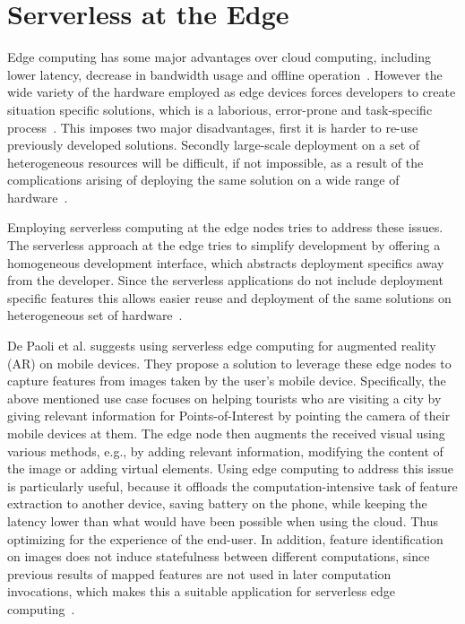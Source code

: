 \documentclass[article]{aaltoseries}
\begin{document}
\section{Serverless at the Edge}\label{sec:pros-and-cons}
Edge computing has some major advantages over cloud computing, including lower latency, decrease in bandwidth usage and offline operation~\cite{shi_edge_2016}. %
However the wide variety of the hardware employed as edge devices forces developers to create situation specific solutions, which is a laborious, error-prone and task-specific process~\cite{nastic_serverless_2017}.
This imposes two major disadvantages, first it is harder to re-use previously developed solutions.
Secondly large-scale deployment on a set of heterogeneous resources will be difficult, if not impossible, as a result of the complications arising of deploying the same solution on a wide range of hardware~\cite{nastic_serverless_2017}.

Employing serverless computing at the edge nodes tries to address these issues.
The serverless approach at the edge tries to simplify development by offering a homogeneous development interface, which abstracts deployment specifics away from the developer.
Since the serverless applications do not include deployment specific features this allows easier reuse and deployment of the same solutions on heterogeneous set of hardware~\cite{nastic_serverless_2017}.

De Paoli et al. \cite{de_paoli_empowering_2017} suggests using serverless edge computing for augmented reality (AR) on mobile devices.
They propose a solution to leverage these edge nodes to capture features from images taken by the user's mobile device.
Specifically, the above mentioned use case focuses on helping tourists who are visiting a city by giving relevant information for Points-of-Interest by pointing the camera of their mobile devices at them.
The edge node then augments the received visual using various methods, e.g., by adding relevant information, modifying the content of the image or adding virtual elements. 
Using edge computing to address this issue is particularly useful, because it offloads the computation-intensive task of feature extraction to another device, saving battery on the phone, while keeping the latency lower than what would have been possible when using the cloud.
Thus optimizing for the experience of the end-user.
In addition, feature identification on images does not induce statefulness between different computations, since previous results of mapped features are not used in later computation invocations, which makes this a suitable application for serverless edge computing~\cite{de_paoli_empowering_2017}.
\end{document}
